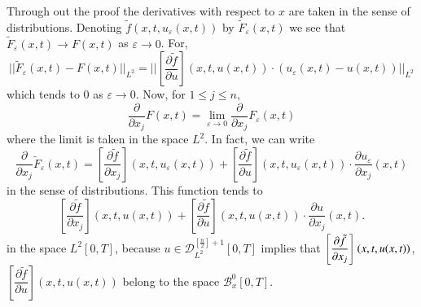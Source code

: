 \begin{proofofthelemma}%
 Through out the proof the derivatives with respect to $x$ are taken
 in the sense of distributions. Denoting $\tilde{f}(x, t,
 u_\varepsilon (x, t))$ by $\tilde{F}_\varepsilon (x, t)$ we see that 
 $\tilde{F}_\varepsilon (x, t) \to F(x, t)$ as $ \varepsilon \to
 0$. For,  
$$ 
|| \tilde{F}_ \varepsilon (x, t) - F (x, t) ||_{L^2} = || \left[
  \frac{\partial \tilde{f}}{\partial u} \right] (x, t, u(x, 
t)) \cdot (u_\varepsilon (x, t) - u(x, t)) ||_{L^2} 
$$
which tends to 0 as $\varepsilon \to 0$. Now, for $1 \leq j \leq n$,  
$$
\frac{\partial}{\partial x_j} F(x, t) = \lim_{\varepsilon \to 0}
\frac{\partial}{\partial x_j} F_\varepsilon (x, t) 
$$
where the limit is taken in the space $L^2$. In fact, we can write 
$$
\frac{\partial}{\partial x_j} \tilde{F}_\varepsilon (x, t) =
     \left[\frac{\partial \tilde{f}}{\partial x_j}\right] (x, t, u_\varepsilon
     (x,t)) + \left[ \frac{\partial \tilde{f}}{\partial u}\right] (x,
     t, u_\varepsilon (x, t)) \cdot \frac{\partial
       u_\varepsilon}{\partial x_j} (x, t) 
$$
in the sense of distributions. This function tends to 
$$
\left[\frac{\partial \tilde{f}}{\partial x_j}\right] (x, t, u(x, t)) + \left[
  \frac{\partial \tilde{f}}{\partial u}\right] (x, t, u(x,
t))\cdot \frac{\partial u}{ \partial x_j} (x, t). 
$$\pageoriginale
in the space $L^2 [ 0, T]$, because $u \in
\mathscr{D}^{\left[\frac{n}{2}\right]+1}_{L^2} [0, T]$ implies that
$\left[\dfrac{\partial \tilde{f}}{\partial x_j}\right]\break (x, t, u(x, t))$,
        $\left[\dfrac{\partial \tilde{f}}{\partial u}\right](x, t,
u(x, t))$ belong to the space $\mathscr{B}^0_x [0, T]$.  
\end{proofofthelemma}

